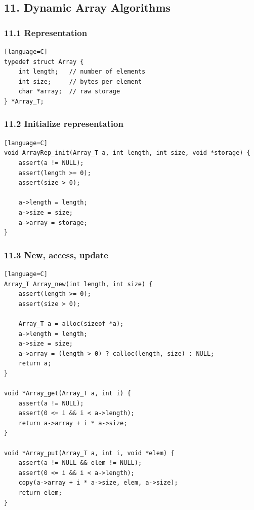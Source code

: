 \documentclass[11pt]{article}
\begin{document}
\subsection{11. Dynamic Array Algorithms}\label{dynamic-array-algorithms}

\subsubsection{11.1 Representation}\label{representation-3}

\begin{verbatim}[language=C]
typedef struct Array {
    int length;   // number of elements
    int size;     // bytes per element
    char *array;  // raw storage
} *Array_T;
\end{verbatim}

\subsubsection{11.2 Initialize representation}\label{initialize-representation}

\begin{verbatim}[language=C]
void ArrayRep_init(Array_T a, int length, int size, void *storage) {
    assert(a != NULL);
    assert(length >= 0);
    assert(size > 0);

    a->length = length;
    a->size = size;
    a->array = storage;
}
\end{verbatim}

\subsubsection{11.3 New, access, update}\label{new-access-update}

\begin{verbatim}[language=C]
Array_T Array_new(int length, int size) {
    assert(length >= 0);
    assert(size > 0);

    Array_T a = alloc(sizeof *a);
    a->length = length;
    a->size = size;
    a->array = (length > 0) ? calloc(length, size) : NULL;
    return a;
}

void *Array_get(Array_T a, int i) {
    assert(a != NULL);
    assert(0 <= i && i < a->length);
    return a->array + i * a->size;
}

void *Array_put(Array_T a, int i, void *elem) {
    assert(a != NULL && elem != NULL);
    assert(0 <= i && i < a->length);
    copy(a->array + i * a->size, elem, a->size);
    return elem;
}
\end{verbatim}
\end{document}
